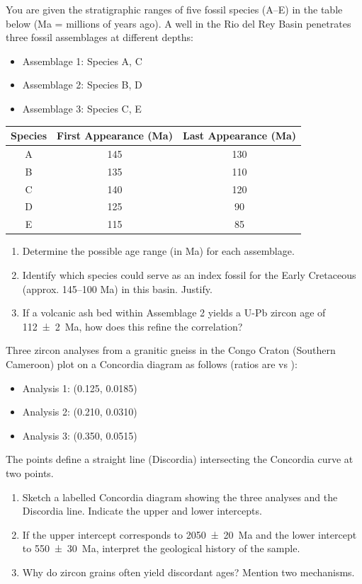 \documentclass[11pt]{article}
\newcommand{\cle}[1]{{\popxbold\color{popdark}#1}}
\begin{document}
\begin{exercice}
You are given the stratigraphic ranges of five fossil species (A--E) in the table below (Ma = millions of years ago). A well in the \cle{Rio del Rey Basin} penetrates three fossil assemblages at different depths:
\begin{itemize}
\item Assemblage 1: Species A, C
\item Assemblage 2: Species B, D
\item Assemblage 3: Species C, E
\end{itemize}
\begin{center}
\begin{tabular}{|c|c|c|}\hline
Species & First Appearance (Ma) & Last Appearance (Ma) \\ \hline
A & 145 & 130 \\
B & 135 & 110 \\
C & 140 & 120 \\
D & 125 & 90 \\
E & 115 & 85 \\ \hline
\end{tabular}
\end{center}
\begin{enumerate}
\item Determine the possible age range (in Ma) for each assemblage.
\item Identify which species could serve as an \cle{index fossil} for the Early Cretaceous (approx. 145--100 Ma) in this basin. Justify.
\item If a volcanic ash bed within Assemblage 2 yields a U-Pb zircon age of \SI{112 \pm 2}{Ma}, how does this refine the correlation?
\end{enumerate}
\end{exercice}

\begin{exercice}
Three zircon analyses from a granitic gneiss in the \cle{Congo Craton} (Southern Cameroon) plot on a Concordia diagram as follows (ratios are  vs ):
\begin{itemize}
\item Analysis 1: (0.125, 0.0185)
\item Analysis 2: (0.210, 0.0310)
\item Analysis 3: (0.350, 0.0515)
\end{itemize}
The points define a straight line (Discordia) intersecting the Concordia curve at two points.
\begin{enumerate}
\item Sketch a labelled Concordia diagram showing the three analyses and the Discordia line. Indicate the upper and lower intercepts.
\item If the upper intercept corresponds to \SI{2050 \pm 20}{Ma} and the lower intercept to \SI{550 \pm 30}{Ma}, interpret the geological history of the sample.
\item Why do zircon grains often yield discordant ages? Mention two mechanisms.
\end{enumerate}
\end{exercice}
\end{document}
